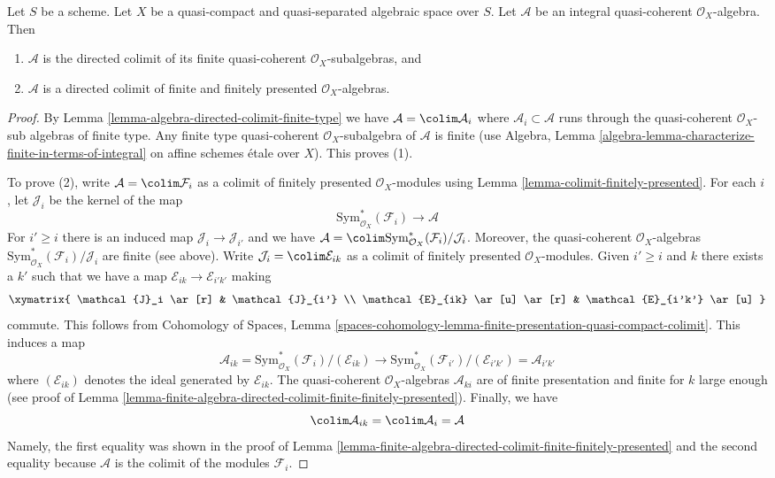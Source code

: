 \begin{lemma}
\label{lemma-integral-algebra-directed-colimit-finite}
Let $S$ be a scheme. Let $X$ be a quasi-compact and quasi-separated
algebraic space over $S$. Let $\mathcal{A}$ be an integral quasi-coherent
$\mathcal{O}_X$-algebra. Then
\begin{enumerate}
\item $\mathcal{A}$ is the directed colimit of its finite
quasi-coherent $\mathcal{O}_X$-subalgebras, and
\item $\mathcal{A}$ is a directed colimit of finite and finitely presented
$\mathcal{O}_X$-algebras.
\end{enumerate}
\end{lemma}

\begin{proof}
By Lemma \ref{lemma-algebra-directed-colimit-finite-type} we have
$\mathcal{A} = \colim \mathcal{A}_i$ where
$\mathcal{A}_i \subset \mathcal{A}$ runs through the
quasi-coherent $\mathcal{O}_X$-sub algebras of finite type.
Any finite type quasi-coherent $\mathcal{O}_X$-subalgebra
of $\mathcal{A}$ is finite (use Algebra, Lemma
\ref{algebra-lemma-characterize-finite-in-terms-of-integral}
on affine schemes \'etale over $X$). This proves (1).

\medskip\noindent
To prove (2), write $\mathcal{A} = \colim \mathcal{F}_i$
as a colimit of finitely presented $\mathcal{O}_X$-modules using
Lemma \ref{lemma-colimit-finitely-presented}.
For each $i$, let $\mathcal{J}_i$ be the kernel of the map
$$
\text{Sym}^*_{\mathcal{O}_X}(\mathcal{F}_i) \longrightarrow \mathcal{A}
$$
For $i' \geq i$ there is an induced map $\mathcal{J}_i \to \mathcal{J}_{i'}$
and we have $\mathcal{A} =
\colim \text{Sym}^*_{\mathcal{O}_X}(\mathcal{F}_i)/\mathcal{J}_i$.
Moreover, the quasi-coherent $\mathcal{O}_X$-algebras
$\text{Sym}^*_{\mathcal{O}_X}(\mathcal{F}_i)/\mathcal{J}_i$
are finite (see above). Write $\mathcal{J}_i = \colim \mathcal{E}_{ik}$
as a colimit of finitely presented $\mathcal{O}_X$-modules.
Given $i' \geq i$ and $k$ there exists a $k'$ such that we
have a map $\mathcal{E}_{ik} \to \mathcal{E}_{i'k'}$
making
$$
\xymatrix{
\mathcal{J}_i \ar[r] & \mathcal{J}_{i'} \\
\mathcal{E}_{ik} \ar[u] \ar[r] & \mathcal{E}_{i'k'} \ar[u]
}
$$
commute. This follows from
Cohomology of Spaces, Lemma
\ref{spaces-cohomology-lemma-finite-presentation-quasi-compact-colimit}.
This induces a map
$$
\mathcal{A}_{ik} =
\text{Sym}^*_{\mathcal{O}_X}(\mathcal{F}_i)/(\mathcal{E}_{ik})
\longrightarrow
\text{Sym}^*_{\mathcal{O}_X}(\mathcal{F}_{i'})/(\mathcal{E}_{i'k'}) =
\mathcal{A}_{i'k'}
$$
where $(\mathcal{E}_{ik})$ denotes the ideal generated by $\mathcal{E}_{ik}$.
The quasi-coherent $\mathcal{O}_X$-algebras $\mathcal{A}_{ki}$
are of finite presentation and finite for $k$ large enough
(see proof of
Lemma \ref{lemma-finite-algebra-directed-colimit-finite-finitely-presented}).
Finally, we have
$$
\colim \mathcal{A}_{ik} = \colim \mathcal{A}_i = \mathcal{A}
$$
Namely, the first equality was shown in the proof of
Lemma \ref{lemma-finite-algebra-directed-colimit-finite-finitely-presented}
and the second equality because $\mathcal{A}$ is the colimit of
the modules $\mathcal{F}_i$.
\end{proof}

